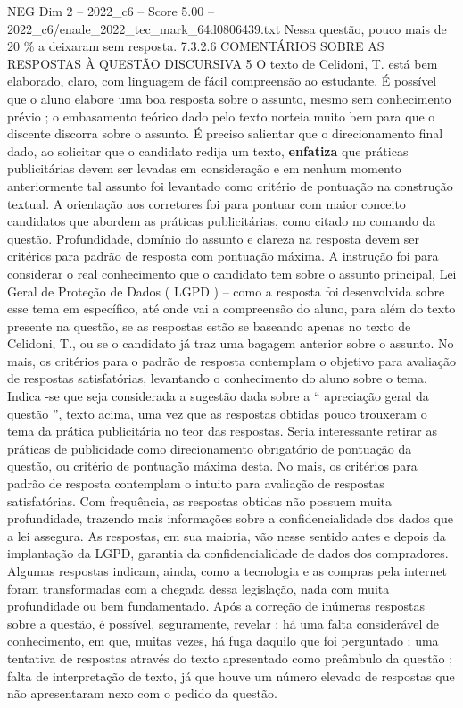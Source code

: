 \begin{textsample}{NEG Dim 2 – 2022\_c6 – Score 5.00 – 2022\_c6/enade\_2022\_tec\_mark\_64d0806439.txt}
Nessa questão, pouco mais de 20 \% a deixaram sem resposta. 7.3.2.6 COMENTÁRIOS SOBRE AS RESPOSTAS À QUESTÃO DISCURSIVA 5 O texto de Celidoni, T. está bem elaborado, claro, com linguagem de fácil compreensão ao estudante.
É possível que o aluno elabore uma boa resposta sobre o assunto, mesmo sem conhecimento prévio ; o embasamento teórico dado pelo texto norteia muito bem para que o discente discorra sobre o assunto.
É preciso salientar que o direcionamento final dado, ao solicitar que o candidato redija um texto, \textbf{enfatiza} que práticas publicitárias devem ser levadas em consideração e em nenhum momento anteriormente tal assunto foi levantado como critério de pontuação na construção textual.
A orientação aos corretores foi para pontuar com maior conceito candidatos que abordem as práticas publicitárias, como citado no comando da questão.
Profundidade, domínio do assunto e clareza na resposta devem ser critérios para padrão de resposta com pontuação máxima.
A instrução foi para considerar o real conhecimento que o candidato tem sobre o assunto principal, Lei Geral de Proteção de Dados ( LGPD ) – como a resposta foi desenvolvida sobre esse tema em específico, até onde vai a compreensão do aluno, para além do texto presente na questão, se as respostas estão se baseando apenas no texto de Celidoni, T., ou se o candidato já traz uma bagagem anterior sobre o assunto.
No mais, os critérios para o padrão de resposta contemplam o objetivo para avaliação de respostas satisfatórias, levantando o conhecimento do aluno sobre o tema.
Indica -se que seja considerada a sugestão dada sobre a “ apreciação geral da questão ”, texto acima, uma vez que as respostas obtidas pouco trouxeram o tema da prática publicitária no teor das respostas.
Seria interessante retirar as práticas de publicidade como direcionamento obrigatório de pontuação da questão, ou critério de pontuação máxima desta.
No mais, os critérios para padrão de resposta contemplam o intuito para avaliação de respostas satisfatórias.
Com frequência, as respostas obtidas não possuem muita profundidade, trazendo mais informações sobre a confidencialidade dos dados que a lei assegura.
As respostas, em sua maioria, vão nesse sentido antes e depois da implantação da LGPD, garantia da confidencialidade de dados dos compradores.
Algumas respostas indicam, ainda, como a tecnologia e as compras pela internet foram transformadas com a chegada dessa legislação, nada com muita profundidade ou bem fundamentado.
Após a correção de inúmeras respostas sobre a questão, é possível, seguramente, revelar : há uma falta considerável de conhecimento, em que, muitas vezes, há fuga daquilo que foi perguntado ; uma tentativa de respostas através do texto apresentado como preâmbulo da questão ; falta de interpretação de texto, já que houve um número elevado de respostas que não apresentaram nexo com o pedido da questão.

\end{textsample}
